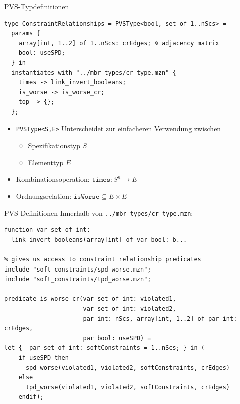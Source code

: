 \documentclass[handout,10pt,xcolor={dvipsnames},fleqn]{beamer}
\begin{document}
\begin{frame}[fragile]{PVS-Typdefinitionen}
\begin{lstlisting}
type ConstraintRelationships = PVSType<bool, set of 1..nScs> = 
  params { 
    array[int, 1..2] of 1..nScs: crEdges; % adjacency matrix
    bool: useSPD;
  } in 
  instantiates with "../mbr_types/cr_type.mzn" {
    times -> link_invert_booleans;
    is_worse -> is_worse_cr;
    top -> {};
  };
\end{lstlisting}
\begin{itemize}
\item \texttt{PVSType<S,E>} Unterscheidet zur einfacheren Verwendung zwischen 
\begin{itemize}
\item[] Spezifikationstyp $S$ 
\item[] Elementtyp $E$
\end{itemize} 
\item Kombinationsoperation: $\mathtt{times} : S^n \to E$
\item Ordnungsrelation: $\mathtt{isWorse} \subseteq E \times E$
\end{itemize}
\end{frame}

\begin{frame}[fragile]{PVS-Definitionen}
Innerhalb von \texttt{../mbr\_types/cr\_type.mzn}:
\begin{lstlisting}
function var set of int: 
  link_invert_booleans(array[int] of var bool: b...

% gives us access to constraint relationship predicates 
include "soft_constraints/spd_worse.mzn";
include "soft_constraints/tpd_worse.mzn";

predicate is_worse_cr(var set of int: violated1, 
                      var set of int: violated2,
                      par int: nScs, array[int, 1..2] of par int: crEdges, 
                      par bool: useSPD) =
let {  par set of int: softConstraints = 1..nScs; } in (                    
    if useSPD then
      spd_worse(violated1, violated2, softConstraints, crEdges)
    else
      tpd_worse(violated1, violated2, softConstraints, crEdges)
    endif);

\end{lstlisting}
\end{frame}
\end{document}
